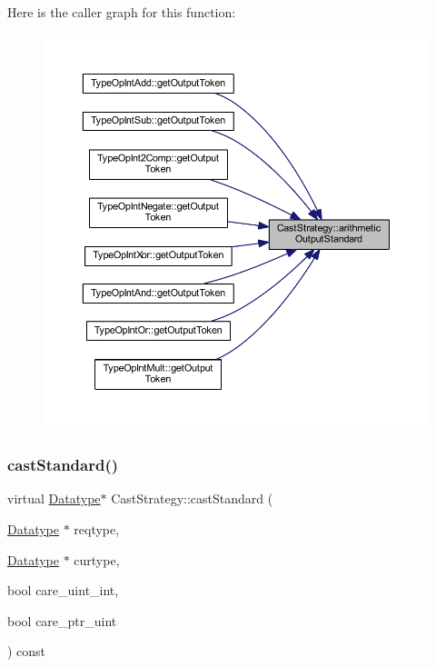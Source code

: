 Here is the caller graph for this function\+:
\nopagebreak
\begin{figure}[H]
\begin{center}
\leavevmode
\includegraphics[width=350pt]{class_cast_strategy_ae1b79520df9f5b6dc22afb6969606054_icgraph}
\end{center}
\end{figure}
\mbox{\label{class_cast_strategy_a9ca9d31afeefca9a43cd8114333bcb21}} 
\subsubsection{\texorpdfstring{castStandard()}{castStandard()}}
{\footnotesize\ttfamily virtual \mbox{\hyperlink{class_datatype}{Datatype}}$\ast$ Cast\+Strategy\+::cast\+Standard (\begin{DoxyParamCaption}\item[{\mbox{\hyperlink{class_datatype}{Datatype}} $\ast$}]{reqtype,  }\item[{\mbox{\hyperlink{class_datatype}{Datatype}} $\ast$}]{curtype,  }\item[{bool}]{care\+\_\+uint\+\_\+int,  }\item[{bool}]{care\+\_\+ptr\+\_\+uint }\end{DoxyParamCaption}) const\hspace{0.3cm}{\ttfamily [pure virtual]}}



